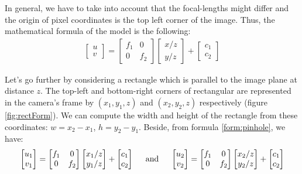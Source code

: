 In general, we have to take into account that the focal-lengths might differ and the origin of pixel coordinates is the top left corner of the image. Thus, the mathematical formula of the model is the following:
\begin{align}
	\label{form:pinhole}
\begin{bmatrix}
	u \\
	v
\end{bmatrix} = \begin{bmatrix}
f_1 & 0 \\
0 & f_2 
\end{bmatrix} \begin{bmatrix}
x/z\\
y/z
\end{bmatrix} + \begin{bmatrix}
c_1 \\ c_2
\end{bmatrix}
\end{align}

Let's go further by considering a rectangle which is parallel to the image plane at distance $z$. The top-left and bottom-right corners of rectangular are represented in the camera's frame by $(x_1, y_1, z)$ and $(x_2, y_2, z)$ respectively (figure \ref{fig:rectForm}). We can compute the width and height of the rectangle from these coordinates: $w = x_2 - x_1$, $h = y_2 - y_1$. Beside, from formula \ref{form:pinhole}, we have:
\begin{align}
	\label{form:dist0}
	\begin{bmatrix}
		u_1 \\
		v_1
	\end{bmatrix} = \begin{bmatrix}
	f_1 & 0 \\
	0 & f_2 
\end{bmatrix} \begin{bmatrix}
x_1/z\\
y_1/z
\end{bmatrix} + \begin{bmatrix}
c_1 \\ c_2
\end{bmatrix}
\hspace{0.5cm} \text{and} \hspace{0.5cm}
	\begin{bmatrix}
		u_2 \\
		v_2
	\end{bmatrix} = \begin{bmatrix}
	f_1 & 0 \\
	0 & f_2 
\end{bmatrix} \begin{bmatrix}
x_2/z\\
y_2/z
\end{bmatrix} + \begin{bmatrix}
c_1 \\ c_2
\end{bmatrix}
\end{align}

